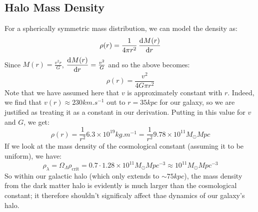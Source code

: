 \subsection{Halo Mass Density}
For a spherically symmetric mass distribution, we can model the density as:
\begin{equation}
    \rho(r) = \frac{1}{4\pi r^2}\dod{M(r)}{r}
\end{equation}
Since $M(r) = \frac{v^2 r}{G}$, $\dod{M(r)}{r} = \frac{v^2}{G}$ and so the above becomes:
\begin{equation}
    \rho(r) = \frac{v^2}{4 G\pi r^2}
\end{equation}
Note that we have assumed here that $v$ is approximately constant with $r$. Indeed, we find that $v(r) \approx 230\si{km.s^{-1}}$ out to $r = 35\si{kpc}$ for our galaxy, so we are justified as treating it as a constant in our derivation. Putting in this value for $v$ and $G$, we get:
\begin{equation}
    \boxed{\rho(r) = \frac{1}{r^2}6.3\times 10^{19}\si{kg.m^{-1}} = \frac{1}{r^2}9.78 \times 10^{11}M_\odot\si{Mpc}}
\end{equation}
If we look at the mass density of the cosmological constant (assuming it to be uniform), we have:
\begin{equation}
    \boxed{\rho_\lambda = \Omega_{\Lambda}\rho_{\text{crit}} = 0.7 \cdot 1.28 \times 10^{11} M_\odot \si{Mpc^{-3}} \approx 10^{11} M_\odot \si{Mpc^{-3}}}
\end{equation}
So within our galactic halo (which only extends to $\sim 75\si{kpc}$), the mass density from the dark matter halo is evidently is much larger than the cosmological constant; it therefore shouldn't significaly affect thae dynamics of our galaxy's halo.

